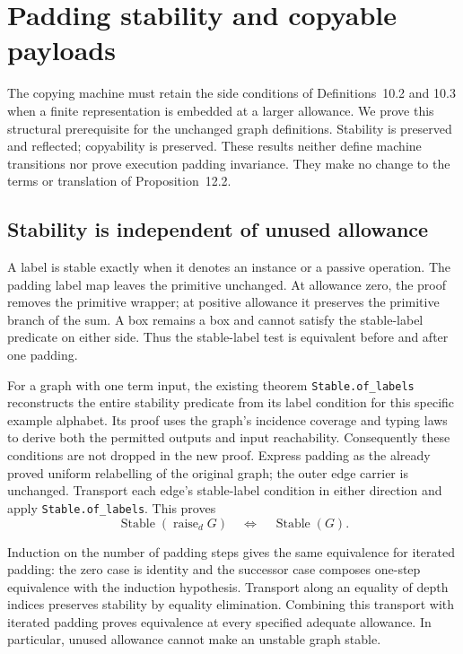 \clearpage
\section{Padding stability and copyable payloads}
\label{sec:copying-padding-predicates}
The copying machine must retain the side conditions of Definitions~10.2
and 10.3 when a finite representation is embedded at a larger allowance.
We prove this structural prerequisite for the unchanged graph definitions.
Stability is preserved and reflected; copyability is preserved. These results
neither define machine transitions nor prove execution padding invariance.
They make no change to the terms or translation of Proposition~12.2.

\subsection{Stability is independent of unused allowance}
A label is stable exactly when it denotes an instance or a passive operation.
The padding label map leaves the primitive unchanged. At allowance zero,
the proof removes the primitive wrapper; at positive allowance it preserves
the primitive branch of the sum. A box remains a box and cannot satisfy the
stable-label predicate on either side. Thus the stable-label test is equivalent
before and after one padding.

For a graph with one term input, the existing theorem \texttt{Stable.of\_labels}
reconstructs the entire stability predicate from its label condition for this
specific example alphabet. Its proof uses the graph's incidence coverage and
typing laws to derive both the permitted outputs and input reachability.
Consequently these conditions are not dropped in the new proof. Express
padding as the already proved uniform relabelling of the original graph;
the outer edge carrier is unchanged. Transport each edge's stable-label
condition in either direction and apply \texttt{Stable.of\_labels}. This proves
\[
  \operatorname{Stable}(\operatorname{raise}_d G)
  \quad\Longleftrightarrow\quad \operatorname{Stable}(G).
\]

Induction on the number of padding steps gives the same equivalence for
iterated padding: the zero case is identity and the successor case composes
one-step equivalence with the induction hypothesis. Transport along an equality
of depth indices preserves stability by equality elimination. Combining this
transport with iterated padding proves equivalence at every specified adequate
allowance. In particular, unused allowance cannot make an unstable graph stable.

